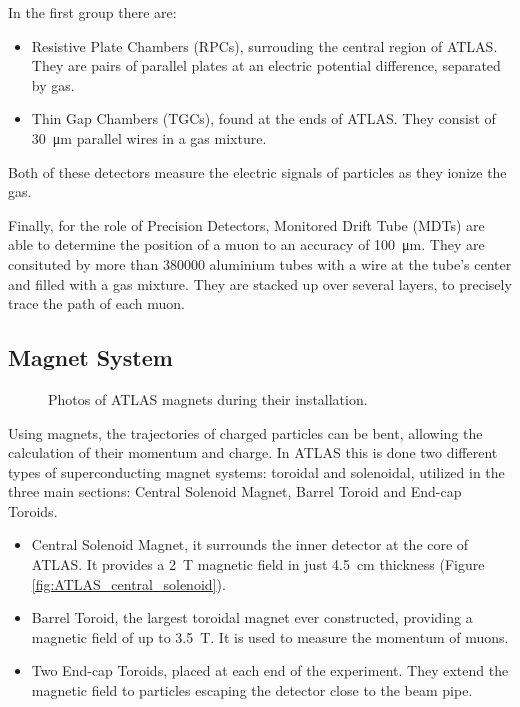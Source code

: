 In the first group there are: 
\begin{itemize}
    \item Resistive Plate Chambers (RPCs), surrouding the central region of ATLAS. They are pairs of parallel plates at an electric potential difference, separated by gas.
    \item Thin Gap Chambers (TGCs), found at the ends of ATLAS. They consist of \qty{30}{\micro\meter} parallel wires in a gas mixture.
\end{itemize}
Both of these detectors measure the electric signals of particles as they ionize the gas.

Finally, for the role of Precision Detectors, Monitored Drift Tube (MDTs) are able to determine the position of a muon to an accuracy of \qty{100}{\micro\meter}. They are consituted by more than \num{380000} aluminium tubes with a wire at the tube's center and filled with a gas mixture. They are stacked up over several layers, to precisely trace the path of each muon.


\subsection{Magnet System}\label{sec:magnet_system}

\begin{figure}[!ht]
    \centering
    \hfill
    \centering
    \caption{Photos of ATLAS magnets during their installation.}
\end{figure}

Using magnets, the trajectories of charged particles can be bent, allowing the calculation of their momentum and charge. In ATLAS this is done two different types of superconducting magnet systems: toroidal and solenoidal, utilized in the three main sections: Central Solenoid Magnet, Barrel Toroid and End-cap Toroids.
\begin{itemize}
    \item Central Solenoid Magnet, it surrounds the inner detector at the core of ATLAS. It provides a \qty{2}{\tesla} magnetic field in just \qty{4.5}{\centi\meter} thickness (Figure \ref{fig:ATLAS_central_solenoid}).
    \item Barrel Toroid, the largest toroidal magnet ever constructed, providing a magnetic field of up to \qty{3.5}{\tesla}. It is used to measure the momentum of muons.
    \item Two End-cap Toroids, placed at each end of the experiment. They extend the magnetic field to particles escaping the detector close to the beam pipe.
\end{itemize}

